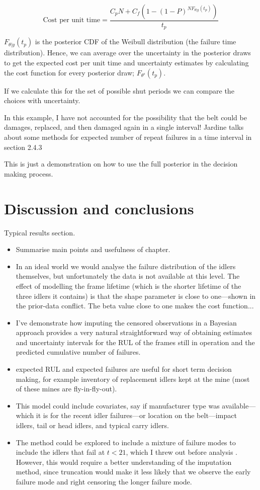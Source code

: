 \begin{equation}
  \text{Cost per unit time} = \frac{C_p N + C_f (1 - (1 - P)^{N F_{\theta|y}(t_p)})}{t_p}
\end{equation}

$F_{\theta|y}(t_p)$ is the posterior CDF of the Weibull distribution (the failure time distribution). Hence, we can average over the uncertainty in the posterior draws to get the expected cost per unit time and uncertainty estimates by calculating the cost function for every posterior draw; $F_{\theta^s}(t_p)$.

If we calculate this for the set of possible shut periods we can compare the choices with uncertainty.

In this example, I have not accounted for the possibility that the belt could be damages, replaced, and then damaged again in a single interval! Jardine talks about some methods for expected number of repeat failures in a time interval in section 2.4.3

This is just a demonstration on how to use the full posterior in the decision making process.

\section{Discussion and conclusions} \label{sec:idler-frame-conclusions}

Typical results section.

\begin{itemize}
  \item Summarise main points and usefulness of chapter.
  \item In an ideal world we would analyse the failure distribution of the idlers themselves, but unfortunately the data is not available at this level. The effect of modelling the frame lifetime (which is the shorter lifetime of the three idlers it contains) is that the shape parameter is close to one---shown in the prior-data conflict. The beta value close to one makes the cost function...
  \item I've demonstrate how imputing the censored observations in a Bayesian approach provides a very natural straightforward way of obtaining estimates and uncertainty intervals for the RUL of the frames still in operation and the predicted cumulative number of failures.
  \item expected RUL and expected failures are useful for short term decision making, for example inventory of replacement idlers kept at the mine (most of these mines are fly-in-fly-out).
  \item This model could include covariates, say if manufacturer type was available---which it is for the recent idler failures---or location on the belt---impact idlers, tail or head idlers, and typical carry idlers.
  \item The method could be explored to include a mixture of failure modes to include the idlers that fail at $t < 21$, which I threw out before analysis \citep{mittman2013}. However, this would require a better understanding of the imputation method, since truncation would make it less likely that we observe the early failure mode and right censoring the longer failure mode.
\end{itemize}